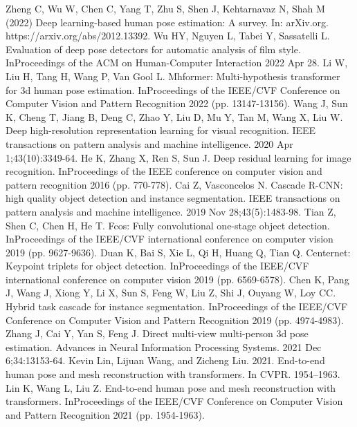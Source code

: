 \documentclass[runningheads]{llncs}
\begin{document}
\begin{thebibliography}{8}
   Zheng C, Wu W, Chen C, Yang T, Zhu S, Shen J, Kehtarnavaz N, Shah M (2022) Deep learning-based human pose estimation: A survey. In: arXiv.org. https://arxiv.org/abs/2012.13392.
   Wu HY, Nguyen L, Tabei Y, Sassatelli L. Evaluation of deep pose detectors for automatic analysis of film style. InProceedings of the ACM on Human-Computer Interaction 2022 Apr 28.
   Li W, Liu H, Tang H, Wang P, Van Gool L. Mhformer: Multi-hypothesis transformer for 3d human pose estimation. InProceedings of the IEEE/CVF Conference on Computer Vision and Pattern Recognition 2022 (pp. 13147-13156).
   Wang J, Sun K, Cheng T, Jiang B, Deng C, Zhao Y, Liu D, Mu Y, Tan M, Wang X, Liu W. Deep high-resolution representation learning for visual recognition. IEEE transactions on pattern analysis and machine intelligence. 2020 Apr 1;43(10):3349-64.
   He K, Zhang X, Ren S, Sun J. Deep residual learning for image recognition. InProceedings of the IEEE conference on computer vision and pattern recognition 2016 (pp. 770-778).
   Cai Z, Vasconcelos N. Cascade R-CNN: high quality object detection and instance segmentation. IEEE transactions on pattern analysis and machine intelligence. 2019 Nov 28;43(5):1483-98.
   Tian Z, Shen C, Chen H, He T. Fcos: Fully convolutional one-stage object detection. InProceedings of the IEEE/CVF international conference on computer vision 2019 (pp. 9627-9636).
   Duan K, Bai S, Xie L, Qi H, Huang Q, Tian Q. Centernet: Keypoint triplets for object detection. InProceedings of the IEEE/CVF international conference on computer vision 2019 (pp. 6569-6578).
   Chen K, Pang J, Wang J, Xiong Y, Li X, Sun S, Feng W, Liu Z, Shi J, Ouyang W, Loy CC. Hybrid task cascade for instance segmentation. InProceedings of the IEEE/CVF Conference on Computer Vision and Pattern Recognition 2019 (pp. 4974-4983).
   Zhang J, Cai Y, Yan S, Feng J. Direct multi-view multi-person 3d pose estimation. Advances in Neural Information Processing Systems. 2021 Dec 6;34:13153-64.
   Kevin Lin, Lijuan Wang, and Zicheng Liu. 2021. End-to-end human pose and mesh reconstruction with transformers. In CVPR. 1954–1963.
   Lin K, Wang L, Liu Z. End-to-end human pose and mesh reconstruction with transformers. InProceedings of the IEEE/CVF Conference on Computer Vision and Pattern Recognition 2021 (pp. 1954-1963).

\end{thebibliography}
\end{document}
